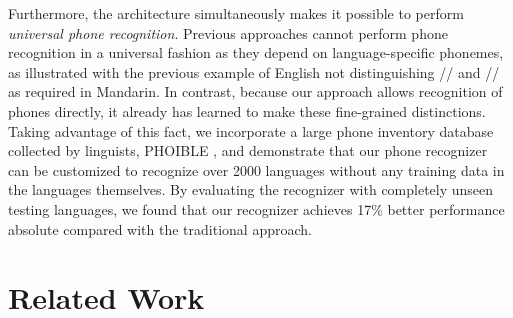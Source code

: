 \documentclass{article}
\newcommand{\gn}[1]{\textcolor{magenta}{\small [#1 --GN]}}
\begin{document}

Furthermore, the architecture simultaneously makes it possible to perform \emph{universal phone recognition}.
Previous approaches cannot perform phone recognition in a universal fashion as they depend on language-specific phonemes, as illustrated with the previous example of English not distinguishing // and // as required in Mandarin.
In contrast, because our approach allows recognition of phones directly, it already has learned to make these fine-grained distinctions.
Taking advantage of this fact, we incorporate a large phone inventory database collected by linguists, PHOIBLE \cite{phoible}, and demonstrate that our phone recognizer can be customized to recognize over 2000 languages without any training data in the languages themselves.
By evaluating the recognizer with completely unseen testing languages, we found that our recognizer achieves 17\% better performance absolute compared with the traditional approach. 




\section{Related Work}
\label{sec:related}
\end{document}
